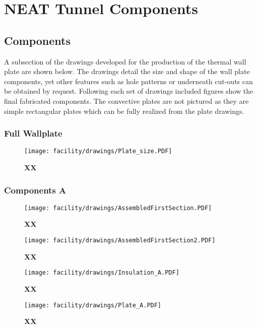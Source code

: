 \chapter{NEAT Tunnel Components} 
\label{sec:NEATcomponents}

\section{Components}
A subsection of the drawings developed for the production of the thermal wall plate are shown below.
The drawings detail the size and shape of the wall plate components, yet other features such as hole patterns or underneath cut-outs can be obtained by request.
Following each set of drawings included figures show the final fabricated components.
The convective plates are not pictured as they are simple rectangular plates which can be fully realized from the plate drawings.

\clearpage
\subsection{Full Wallplate}

\begin{figure}[h!]
\centering
\texttt{[image: facility/drawings/Plate\_size.PDF]}
\caption{\footnotesize {\bf XX} } 
\end{figure}

\clearpage
\subsection{Components A}

\begin{figure}[h!]
\centering
\texttt{[image: facility/drawings/AssembledFirstSection.PDF]}
\caption{\footnotesize {\bf XX} } 
\end{figure}

\begin{figure}[h!]
\centering
\texttt{[image: facility/drawings/AssembledFirstSection2.PDF]}
\caption{\footnotesize {\bf XX} } 
\end{figure}

\begin{figure}[h!]
\centering
\texttt{[image: facility/drawings/Insulation\_A.PDF]}
\caption{\footnotesize {\bf XX} } 
\end{figure}

\begin{figure}[h!]
\centering
\texttt{[image: facility/drawings/Plate\_A.PDF]}
\caption{\footnotesize {\bf XX} } 
\end{figure}


